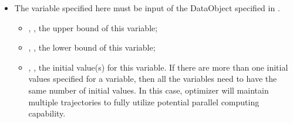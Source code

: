 \begin{itemize}
\item \variableDescription
 The variable specified here must be input of the DataObject specified in .
 \variableChildrenIntro
 \begin{itemize}
    \item {}, , the upper bound of this variable;
    \item {}, , the lower bound of this variable;
    \item {}, , the initial value(s) for this variable. If there are more than one initial values specified for a variable, then all the variables need to have the same number of initial values. In this case,  optimizer will maintain multiple trajectories to fully utilize potential parallel computing capability.  
  \end{itemize}
\end{itemize}
